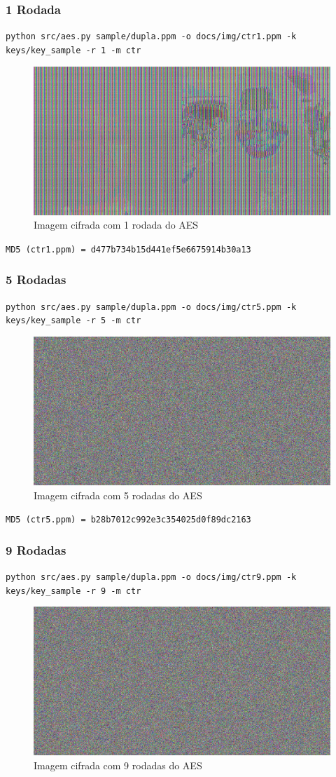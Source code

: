 \documentclass[12pt]{article}
\begin{document}
\subsubsection{1 Rodada}

\texttt{python src/aes.py sample/dupla.ppm -o docs/img/ctr1.ppm -k keys/key\_sample -r 1 -m ctr}

\begin{figure}[H]
	\centering
    \includegraphics[width=.5\textwidth]{img/ctr1.jpg}
    \caption{Imagem cifrada com 1 rodada do AES}
\end{figure}

\noindent \texttt{MD5 (ctr1.ppm) = d477b734b15d441ef5e6675914b30a13}

\subsubsection{5 Rodadas}

\texttt{python src/aes.py sample/dupla.ppm -o docs/img/ctr5.ppm -k keys/key\_sample -r 5 -m ctr}

\begin{figure}[H]
	\centering
    \includegraphics[width=.5\textwidth]{img/ctr5.jpg}
    \caption{Imagem cifrada com 5 rodadas do AES}
\end{figure}

\noindent \texttt{MD5 (ctr5.ppm) = b28b7012c992e3c354025d0f89dc2163}

\subsubsection{9 Rodadas}

\texttt{python src/aes.py sample/dupla.ppm -o docs/img/ctr9.ppm -k keys/key\_sample -r 9 -m ctr}

\begin{figure}[H]
	\centering
    \includegraphics[width=.5\textwidth]{img/ctr9.jpg}
    \caption{Imagem cifrada com 9 rodadas do AES}
\end{figure}
\end{document}
